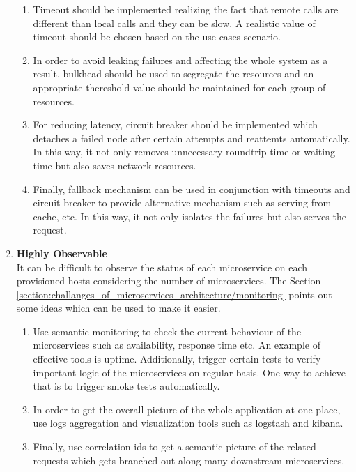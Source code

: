 \begin{enumerate}
\begin{enumerate}
\item Timeout should be implemented realizing the fact that remote calls are different than local calls and they can be slow. A realistic value of timeout should be chosen based on the use cases scenario.
\item In order to avoid leaking failures and affecting the whole system as a result, bulkhead should be used to segregate the resources and an appropriate thereshold value should be maintained for each group of resources.
\item For reducing latency, circuit breaker should be implemented which detaches a failed node after certain attempts and reattemts automatically. In this way, it not only removes unnecessary roundtrip time or waiting time but also saves network resources.
\item Finally, fallback mechanism can be used in conjunction with timeouts and circuit breaker to provide alternative mechanism such as serving from cache, etc. In this way, it not only isolates the failures but also serves the request.
\end{enumerate}
\item \textbf{Highly Observable} \\
It can be difficult to observe the status of each microservice on each provisioned hosts considering the number of microservices. The Section \ref{section:challanges_of_microservices_architecture/monitoring} points out some ideas which can be used to make it easier.
\begin{enumerate}
\item Use semantic monitoring to check the current behaviour of the microservices such as availability, response time etc. An example of effective tools is uptime. Additionally, trigger certain tests to verify important logic of the microservices on regular basis. One way to achieve that is to trigger smoke tests automatically.
\item In order to get the overall picture of the whole application at one place, use logs aggregation and visualization tools such as logstash and kibana.
\item Finally, use correlation ids to get a semantic picture of the related requests which gets branched out along many downstream microservices.
\end{enumerate}
\end{enumerate}